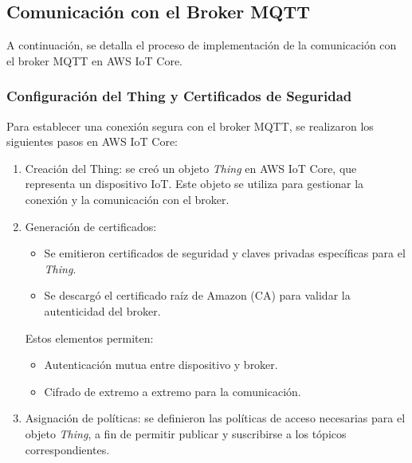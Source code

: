 


\subsection{Comunicación con el Broker MQTT}

A continuación, se detalla el proceso de implementación de la comunicación con
el broker MQTT en AWS IoT Core.

\subsubsection{Configuración del Thing y Certificados de Seguridad}

Para establecer una conexión segura con el broker MQTT, se realizaron los
siguientes pasos en AWS IoT Core:

\begin{enumerate}
    \item Creación del Thing: se creó un objeto \textit{Thing} en AWS IoT Core, que
          representa un dispositivo IoT. Este objeto se utiliza para gestionar la
          conexión y la comunicación con el broker.

    \item Generación de certificados:
          \begin{itemize}
              \item Se emitieron certificados de seguridad y claves privadas específicas para el
                    \textit{Thing}.
              \item Se descargó el certificado raíz de Amazon (CA) para validar la autenticidad del
                    broker.
          \end{itemize}
          Estos elementos permiten:
          \begin{itemize}
              \item Autenticación mutua entre dispositivo y broker.
              \item Cifrado de extremo a extremo para la comunicación.
          \end{itemize}

    \item Asignación de políticas: se definieron las políticas de acceso necesarias para
          el objeto \textit{Thing}, a fin de permitir publicar y suscribirse a los
          tópicos correspondientes.
\end{enumerate}

